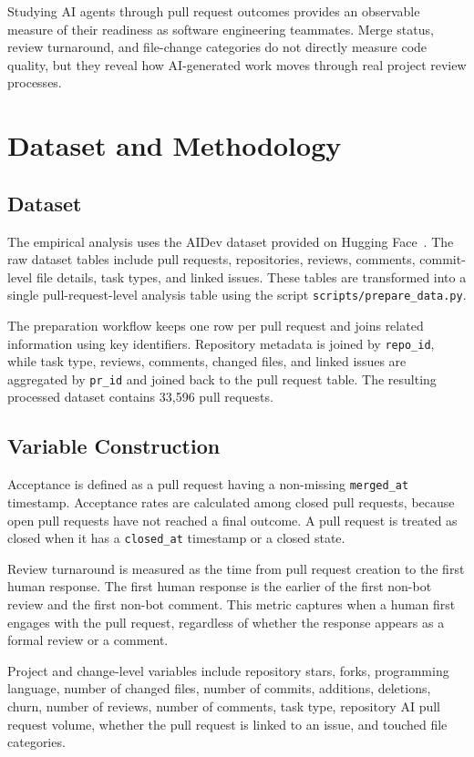 \documentclass[sigconf,nonacm]{acmart}
\begin{document}
Studying AI agents through pull request outcomes provides an observable measure of their readiness as software engineering teammates. Merge status, review turnaround, and file-change categories do not directly measure code quality, but they reveal how AI-generated work moves through real project review processes.

\section{Dataset and Methodology}

\subsection{Dataset}

The empirical analysis uses the AIDev dataset provided on Hugging Face~\cite{aidev_dataset}. The raw dataset tables include pull requests, repositories, reviews, comments, commit-level file details, task types, and linked issues. These tables are transformed into a single pull-request-level analysis table using the script \texttt{scripts/prepare\_data.py}.

The preparation workflow keeps one row per pull request and joins related information using key identifiers. Repository metadata is joined by \texttt{repo\_id}, while task type, reviews, comments, changed files, and linked issues are aggregated by \texttt{pr\_id} and joined back to the pull request table. The resulting processed dataset contains 33,596 pull requests.

\subsection{Variable Construction}

Acceptance is defined as a pull request having a non-missing \texttt{merged\_at} timestamp. Acceptance rates are calculated among closed pull requests, because open pull requests have not reached a final outcome. A pull request is treated as closed when it has a \texttt{closed\_at} timestamp or a closed state.

Review turnaround is measured as the time from pull request creation to the first human response. The first human response is the earlier of the first non-bot review and the first non-bot comment. This metric captures when a human first engages with the pull request, regardless of whether the response appears as a formal review or a comment.

Project and change-level variables include repository stars, forks, programming language, number of changed files, number of commits, additions, deletions, churn, number of reviews, number of comments, task type, repository AI pull request volume, whether the pull request is linked to an issue, and touched file categories.
\end{document}
